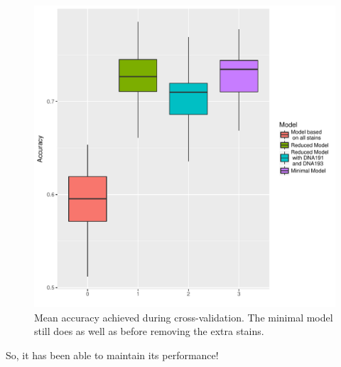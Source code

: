 \documentclass[a4paper]{article}\usepackage[]{graphicx}\usepackage[]{color}
\makeatletter
\def\maxwidth{ %
  \ifdim\Gin@nat@width>\linewidth
    \linewidth
  \else
    \Gin@nat@width
  \fi
}
\newenvironment{knitrout}{}{} %
\makeatother
\begin{document}
\begin{knitrout}
\begin{figure}[h]
\includegraphics[width=\maxwidth]{figure/FigModelCrossVal2-1} \caption[Mean accuracy achieved during cross-validation]{Mean accuracy achieved during cross-validation. The minimal model still does as well as before removing the extra stains.}\label{fig:FigModelCrossVal2}
\end{figure}


\end{knitrout}
So, it has been able to maintain its performance!
\end{document}
